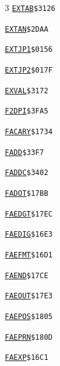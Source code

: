 \begin{multicols}{3}
\noindent\hyperlink{l:EXTAB}{\texttt{EXTAB}}\hfill\texttt{\$3126~\phantom{000}\llap{\pageref{l:EXTAB}}}\par
\noindent\hyperlink{l:EXTAN}{\texttt{EXTAN}}\hfill\texttt{\$2DAA~\phantom{000}\llap{\pageref{l:EXTAN}}}\par
\noindent\hyperlink{l:EXTJP1}{\texttt{EXTJP1}}\hfill\texttt{\$0156~\phantom{000}\llap{\pageref{l:EXTJP1}}}\par
\noindent\hyperlink{l:EXTJP2}{\texttt{EXTJP2}}\hfill\texttt{\$017F~\phantom{000}\llap{\pageref{l:EXTJP2}}}\par
\noindent\hyperlink{l:EXVAL}{\texttt{EXVAL}}\hfill\texttt{\$3172~\phantom{000}\llap{\pageref{l:EXVAL}}}\par
\noindent\hyperlink{l:F2DPI}{\texttt{F2DPI}}\hfill\texttt{\$3FA5~\phantom{000}\llap{\pageref{l:F2DPI}}}\par
\noindent\hyperlink{l:FACARY}{\texttt{FACARY}}\hfill\texttt{\$1734~\phantom{000}\llap{\pageref{l:FACARY}}}\par
\noindent\hyperlink{l:FADD}{\texttt{FADD}}\hfill\texttt{\$33F7~\phantom{000}\llap{\pageref{l:FADD}}}\par
\noindent\hyperlink{l:FADDC}{\texttt{FADDC}}\hfill\texttt{\$3402~\phantom{000}\llap{\pageref{l:FADDC}}}\par
\noindent\hyperlink{l:FADOT}{\texttt{FADOT}}\hfill\texttt{\$17BB~\phantom{000}\llap{\pageref{l:FADOT}}}\par
\noindent\hyperlink{l:FAEDGT}{\texttt{FAEDGT}}\hfill\texttt{\$17EC~\phantom{000}\llap{\pageref{l:FAEDGT}}}\par
\noindent\hyperlink{l:FAEDIG}{\texttt{FAEDIG}}\hfill\texttt{\$16E3~\phantom{000}\llap{\pageref{l:FAEDIG}}}\par
\noindent\hyperlink{l:FAEFMT}{\texttt{FAEFMT}}\hfill\texttt{\$16D1~\phantom{000}\llap{\pageref{l:FAEFMT}}}\par
\noindent\hyperlink{l:FAEND}{\texttt{FAEND}}\hfill\texttt{\$17CE~\phantom{000}\llap{\pageref{l:FAEND}}}\par
\noindent\hyperlink{l:FAEOUT}{\texttt{FAEOUT}}\hfill\texttt{\$17E3~\phantom{000}\llap{\pageref{l:FAEOUT}}}\par
\noindent\hyperlink{l:FAEPOS}{\texttt{FAEPOS}}\hfill\texttt{\$1805~\phantom{000}\llap{\pageref{l:FAEPOS}}}\par
\noindent\hyperlink{l:FAEPRN}{\texttt{FAEPRN}}\hfill\texttt{\$180D~\phantom{000}\llap{\pageref{l:FAEPRN}}}\par
\noindent\hyperlink{l:FAEXP}{\texttt{FAEXP}}\hfill\texttt{\$16C1~\phantom{000}\llap{\pageref{l:FAEXP}}}\par

\end{multicols}
